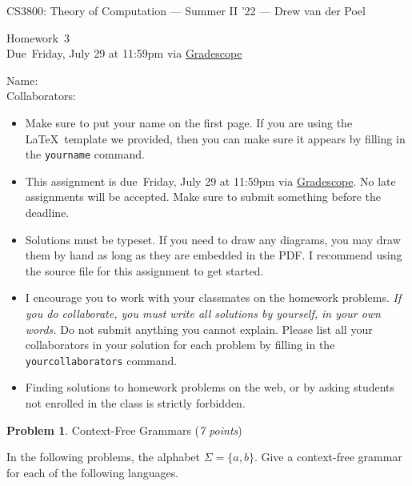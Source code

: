 \documentclass[11pt]{article}
\newcommand{\yourname}{}
\newcommand{\yourcollaborators}{}
\theoremstyle{definition}
\newcommand{\instructor}{Drew van der Poel}
\newcommand{\hwnum}{3}
\newcommand{\hwdue}{Friday, July 29 at 11:59pm via \href{https://www.gradescope.com/courses/406943}{Gradescope}}
\theoremstyle{theorem}
\newtheorem{prob}{Problem}
\begin{document}
{\Large 
\begin{center}{CS3800: Theory of Computation} --- Summer II '22 --- \instructor \end{center}}
{\large
\vspace{10pt}
\noindent Homework~\hwnum \vspace{2pt}\\
Due~\hwdue}

\bigskip
{\large
\noindent Name: \yourname \vspace{2pt}\\ Collaborators: \yourcollaborators}

\vspace{15pt}
\begin{itemize}

\item Make sure to put your name on the first page.  If you are using the \LaTeX~template we provided, then you can make sure it appears by filling in the \texttt{yourname} command.

\item This assignment is due~\hwdue.  No late assignments will be accepted.  Make sure to submit something before the deadline.

\item Solutions must be typeset.  If you need to draw any diagrams, you may draw them by hand as long as they are embedded in the PDF.  I recommend using the source file for this assignment to get started.

\item I encourage you to work with your classmates on the homework problems. \emph{If you do collaborate, you must write all solutions by yourself, in your own words.}  Do not submit anything you cannot explain.  Please list all your collaborators in your solution for each problem by filling in the \texttt{yourcollaborators} command.

\item Finding solutions to homework problems on the web, or by asking students not enrolled in the class is strictly forbidden.

\end{itemize}


\newpage

\begin{prob} Context-Free Grammars (\emph{7 points})\end{prob}

In the following problems, the alphabet $\Sigma = \{a, b\}$. Give a context-free grammar for each of the following languages.
\end{document}
